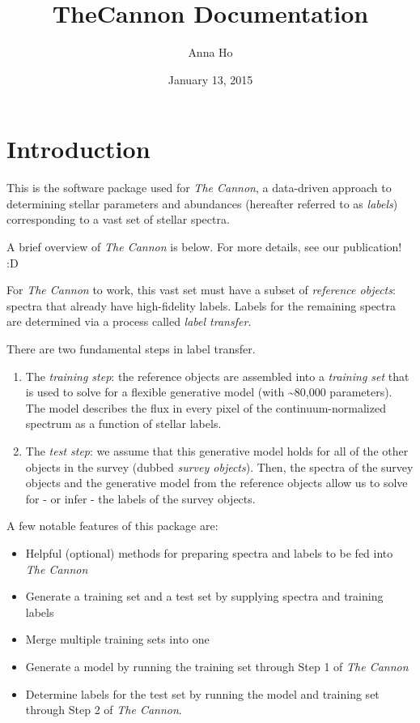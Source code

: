 \documentclass[letterpaper,10pt,english]{sphinxmanual}
\title{TheCannon Documentation}
\date{January 13, 2015}
\author{Anna Ho}
\begin{document}
\maketitle
\tableofcontents
{}\label{index::doc}



\chapter{Introduction}
\label{index:introduction}\label{index:the-cannon-data-driven-stellar-labels}
This is the software package used for \emph{The Cannon},
a data-driven approach to determining stellar parameters
and abundances (hereafter referred to as \emph{labels}) corresponding to a
vast set of stellar spectra.

A brief overview of \emph{The Cannon} is below. For more details, see our
publication! :D

For \emph{The Cannon} to work, this vast set must have a subset of \emph{reference
objects}: spectra that already have high-fidelity labels. Labels for the
remaining spectra are determined via a process called \emph{label transfer.}

There are two fundamental steps in label transfer.
\begin{enumerate}
\item {} 
The \emph{training step}: the reference objects are assembled into a
\emph{training set} that is used to solve for a flexible generative model
(with \textasciitilde{}80,000 parameters). The model describes the flux in every pixel
of the continuum-normalized spectrum as a function of stellar labels.

\item {} 
The \emph{test step}: we assume that this generative model holds for all
of the other objects in the survey (dubbed \emph{survey objects}).
Then, the spectra of the survey objects and the generative model from
the reference objects allow us to solve for - or infer - the labels
of the survey objects.

\end{enumerate}

A few notable features of this package are:
\begin{itemize}
\item {} 
Helpful (optional) methods for preparing spectra and labels to be
fed into \emph{The Cannon}

\item {} 
Generate a training set and a test set by supplying spectra and training
labels

\item {} 
Merge multiple training sets into one

\item {} 
Generate a model by running the training set through Step 1 of \emph{The Cannon}

\item {} 
Determine labels for the test set by running the model and training set
through Step 2 of \emph{The Cannon}.

\end{itemize}
\end{document}
